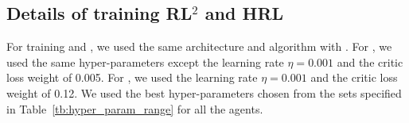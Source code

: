 \documentclass{article} \usepackage{iclr2020_conference,times}
\begin{document}
\subsection{Details of training RL$^2$ and HRL}
\label{sec:appendix_training_rlhrl}

For training \RLSquare and \HRL, we used the same architecture and algorithm with \NSGIMeta.
For \RLSquare, we used the same hyper-parameters except the learning rate $\eta=0.001$ and the critic loss weight of 0.005.
For \HRL, we used the learning rate $\eta=0.001$ and the critic loss weight of 0.12. We used the best hyper-parameters chosen from the sets specified in Table~\ref{tb:hyper_param_range} for all the agents.
 
\end{document}
